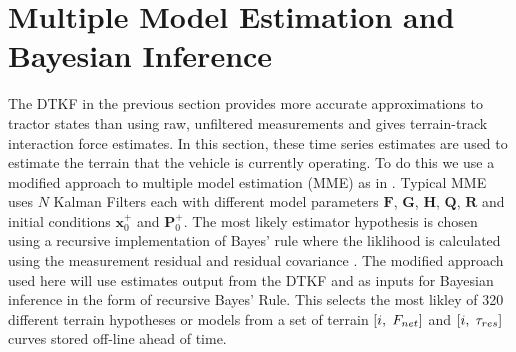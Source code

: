 \section{Multiple Model Estimation and Bayesian Inference}
\label{s:MME}
The DTKF in the previous section provides more accurate approximations to tractor states than using raw, unfiltered measurements and gives terrain-track interaction force estimates. In this section, these time series estimates are used to estimate the terrain that the vehicle is currently operating. To do this we use a modified approach to multiple model estimation (MME) as in \cite{ray2009estimationTerrainForcesParameters}. Typical MME uses $N$ Kalman Filters each with different model parameters $\mathbf{F}$, $\mathbf{G}$, $\mathbf{H}$, $\mathbf{Q}$, $\mathbf{R}$ and initial conditions $\mathbf{x}_0^+$ and $\mathbf{P}_0^+$. The most likely estimator hypothesis is chosen using a recursive implementation of Bayes' rule where the liklihood is calculated using the measurement residual and residual covariance \cite{stengel2012optimal}. The modified approach used here will use estimates output from the DTKF and as inputs for Bayesian inference in the form of recursive Bayes' Rule. This selects the most likley of 320 different terrain hypotheses or models from a set of terrain $[i,\hspace{1mm}F_{net}]$ and $[i,\hspace{1mm}\tau_{res}]$ curves stored off-line ahead of time.

